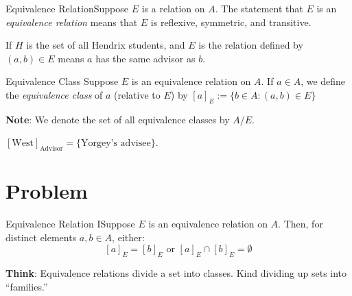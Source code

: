    
            \begin{definition}
                {Equivalence Relation}Suppose \(E\) is a relation on \(A\). The statement that \(E\) is an \textit{equivalence relation} means that \(E\) is reflexive, symmetric, and transitive. 
            \end{definition}
        
            \begin{example}
                If \(H\) is the set of all Hendrix students, and \(E\) is the relation defined by \((a,b)\in E\) means \(a\) has the same advisor as \(b\).
            \end{example}
    
    
            \begin{definition}
               {Equivalence Class} Suppose \(E\) is an equivalence relation on \(A\). If \(a\in A\), we define the \textit{equivalence class} of \(a\) (relative to \(E\)) by \([a]_E := \{b\in A\colon (a,b) \in E\}\)
            \end{definition}
            \textbf{Note}: We denote the set of all equivalence classes by \(A/E\).
        
            \begin{example}
                \([\text{West}]_\text{Advisor} = \{\text{Yorgey's advisee}\}\). 
            \end{example}
    
        \section{Problem}


            \begin{exercise}
                {Equivalence Relation I}Suppose \(E\) is an equivalence relation on \(A\). Then, for distinct elements \(a,b\in A\), either: \[[a]_E = [b]_E \text{ or } [a]_E \cap [b]_E = \emptyset\]
            \end{exercise}
            \textbf{Think}: Equivalence relations divide a set into classes. Kind dividing up sets into ``families.''

